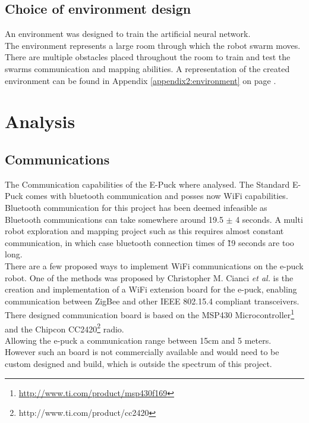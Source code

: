 \subsection{Choice of environment design}
An environment was designed to train the artificial neural network.\\
The environment represents a large room through which the robot swarm moves. There are multiple obstacles placed throughout the room to train and test the swarms communication and mapping abilities. A representation of the created environment can be found in Appendix  \ref{appendix2:environment} on page \pageref{appendix2:environment}. \\




\section{Analysis}

\subsection{Communications}
\label{chap1:communication}
The Communication capabilities of the E-Puck where analysed. The Standard E-Puck comes  with bluetooth communication and posses now WiFi capabilities. \\
Bluetooth  communication for this project has been deemed infeasible as Bluetooth communications can take somewhere around 19.5 $\pm$ 4 seconds. A multi robot exploration and mapping project such as this requires almost constant communication, in which case bluetooth connection times of \~19 seconds are too long.\\

There are a few proposed ways to implement WiFi communications on the e-puck robot. 
One of the methods was proposed by Christopher M. Cianci \textit{et al.}\cite{Cianci2007Communication} is the creation and implementation of a WiFi extension board for the e-puck, enabling communication between ZigBee and other IEEE 802.15.4 compliant transceivers. \\
There designed communication board is based on the MSP430 Microcontroller\footnote{\url{http://www.ti.com/product/msp430f169}} and the Chipcon CC2420\footnote{http://www.ti.com/product/cc2420} radio.\\
Allowing the e-puck a communication range between 15cm and 5 meters. \\
However such an board is not commercially available and would need to be custom designed and build, which is outside the spectrum of this project.

